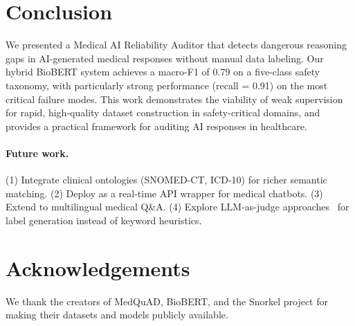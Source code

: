 \documentclass[11pt,a4paper]{article}
\begin{document}
\section{Conclusion}
\label{sec:conclusion}

We presented a Medical AI Reliability Auditor that detects dangerous reasoning gaps in AI-generated medical responses without manual data labeling. Our hybrid BioBERT system achieves a macro-F1 of 0.79 on a five-class safety taxonomy, with particularly strong performance (recall = 0.91) on the most critical failure modes. This work demonstrates the viability of weak supervision for rapid, high-quality dataset construction in safety-critical domains, and provides a practical framework for auditing AI responses in healthcare.

\paragraph{Future work.}
(1) Integrate clinical ontologies (SNOMED-CT, ICD-10) for richer semantic matching. (2) Deploy as a real-time API wrapper for medical chatbots. (3) Extend to multilingual medical Q\&A. (4) Explore LLM-as-judge approaches~\citep{zheng2023} for label generation instead of keyword heuristics.

\section*{Acknowledgements}

We thank the creators of MedQuAD, BioBERT, and the Snorkel project for making their datasets and models publicly available.
\end{document}
